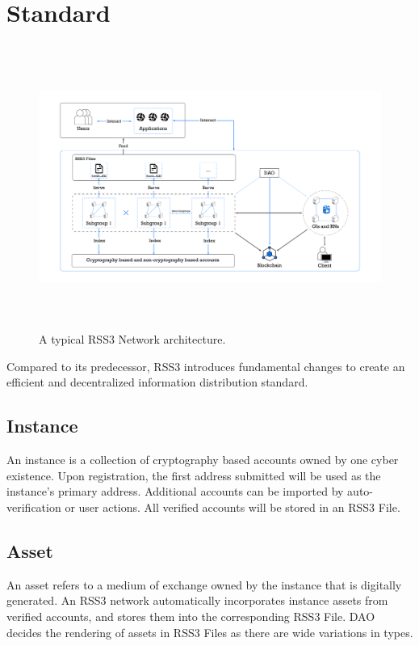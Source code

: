 \section{Standard} 

\begin{figure}[tb!]
    \centering
    \includegraphics[height=9.3cm]{figures/network-arch.jpg}
    \caption{A typical RSS3 Network architecture.}
    \label{fig:network-arch}
\end{figure}

Compared to its predecessor, RSS3 introduces fundamental changes to create an efficient and decentralized information distribution standard.

\subsection{Instance}

An instance is a collection of cryptography based accounts owned by one cyber existence. Upon registration, the first address submitted will be used as the instance's primary address. Additional accounts can be imported by auto-verification or user actions. All verified accounts will be stored in an RSS3 File. 

\subsection{Asset}

An asset refers to a medium of exchange owned by the instance that is digitally generated. An RSS3 network automatically incorporates instance assets from verified accounts, and stores them into the corresponding RSS3 File. DAO decides the rendering of assets in RSS3 Files as there are wide variations in types.

